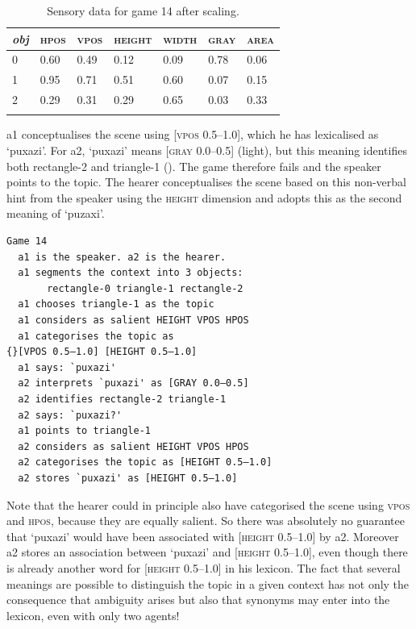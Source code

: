\begin{table}
\begin{center}
\begin{tabular}{ l  l  l  l  l  l  l }
\lsptoprule
{\itshape obj} & \textsc{hpos} & \textsc{vpos} & \textsc{height} & \textsc{width} & \textsc{gray} & \textsc{area} \\ \midrule
0 & 0.60 & 0.49 & 0.12 & 0.09 & 0.78 & 0.06\\ 
1 & 0.95 & 0.71 & 0.51 & 0.60 & 0.07 & 0.15\\ 
2 & 0.29 & 0.31 & 0.29 & 0.65 & 0.03 & 0.33\\ 
\lspbottomrule
\end{tabular}
\caption{\label{tab:game14}Sensory data for game 14 after scaling.}
\end{center}
\end{table}
\clearpage
{\bfshape  a1} conceptualises the scene using 
{}[\textsc{vpos} 0.5–1.0], which he has lexicalised as `puxazi'. 
For {\bfshape  a2}, `puxazi' means [\textsc{gray} 0.0–0.5] (light), but this 
meaning identifies both rectangle-2 and
triangle-1 (). The game therefore
fails and the speaker points to the topic. The hearer
conceptualises the scene based on this non-verbal
hint from the speaker using the \textsc{height} dimension and adopts this as the second meaning 
of `puzaxi'. 
\begin{verbatim}
Game 14
  a1 is the speaker. a2 is the hearer. 
  a1 segments the context into 3 objects: 
       rectangle-0 triangle-1 rectangle-2
  a1 chooses triangle-1 as the topic 
  a1 considers as salient HEIGHT VPOS HPOS 
  a1 categorises the topic as 
{}[VPOS 0.5–1.0] [HEIGHT 0.5–1.0]
  a1 says: `puxazi'
  a2 interprets `puxazi' as [GRAY 0.0–0.5]
  a2 identifies rectangle-2 triangle-1
  a2 says: `puxazi?'
  a1 points to triangle-1
  a2 considers as salient HEIGHT VPOS HPOS 
  a2 categorises the topic as [HEIGHT 0.5–1.0]
  a2 stores `puxazi' as [HEIGHT 0.5–1.0]
\end{verbatim}
Note that the hearer could in principle 
also have categorised the
scene using \textsc{vpos} and \textsc{hpos}, because they are
equally salient. So there was absolutely no 
guarantee that `puxazi' would have been associated 
with [\textsc{height} 0.5–1.0] by {\bfshape  a2}. Moreover {\bfshape  a2} stores
an association between `puxazi' and [\textsc{height} 0.5–1.0], even though 
there is already another word for 
{}[\textsc{height} 0.5–1.0] in his lexicon. The fact that 
several meanings are possible to distinguish the topic in a given 
context has not only the consequence that ambiguity
arises but also that synonyms may enter into the lexicon, 
even with only two agents!



